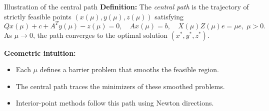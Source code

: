\documentclass{beamer}
\begin{document}
\begin{frame}{Illustration of the central path}
\textbf{Definition:} The \emph{central path} is the trajectory of strictly feasible points $(x(\mu), y(\mu), z(\mu))$ satisfying
\[
Qx(\mu) + c + A^T y(\mu) - z(\mu) = 0, \quad Ax(\mu) = b, \quad X(\mu) Z(\mu)e = \mu e,\; \mu>0.
\]
As $\mu \to 0$, the path converges to the optimal solution $(x^*,y^*,z^*)$.

\vspace{2mm}
\textbf{Geometric intuition:}
\begin{itemize}
  \item Each $\mu$ defines a barrier problem that smooths the feasible region.
  \item The central path traces the minimizers of these smoothed problems.
  \item Interior-point methods follow this path using Newton directions.
\end{itemize}

\vspace{2mm}
\begin{center}
\end{center}
\end{frame}
\end{document}
